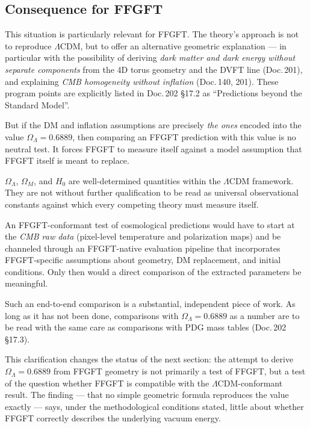 \subsection{Consequence for FFGFT}

This situation is particularly relevant for FFGFT. The theory's approach is not to reproduce \(\Lambda\)CDM, but to offer an alternative geometric explanation --- in particular with the possibility of deriving \emph{dark matter and dark energy without separate components} from the 4D torus geometry and the DVFT line (Doc.\,201), and explaining \emph{CMB homogeneity without inflation} (Doc.\,140, 201). These program points are explicitly listed in Doc.\,202 \S17.2 as ``Predictions beyond the Standard Model''.

But if the DM and inflation assumptions are precisely \emph{the ones} encoded into the value \(\Omega_\Lambda = 0.6889\), then comparing an FFGFT prediction with this value is no neutral test. It forces FFGFT to measure itself against a model assumption that FFGFT itself is meant to replace.

\begin{conclusionBox}
\(\Omega_\Lambda\), \(\Omega_M\), and \(H_0\) are well-determined quantities within the \(\Lambda\)CDM framework. They are not without further qualification to be read as universal observational constants against which every competing theory must measure itself.

An FFGFT-conformant test of cosmological predictions would have to start at the \emph{CMB raw data} (pixel-level temperature and polarization maps) and be channeled through an FFGFT-native evaluation pipeline that incorporates FFGFT-specific assumptions about geometry, DM replacement, and initial conditions. Only then would a direct comparison of the extracted parameters be meaningful.

Such an end-to-end comparison is a substantial, independent piece of work. As long as it has not been done, comparisons with \(\Omega_\Lambda = 0.6889\) as a number are to be read with the same care as comparisons with PDG mass tables (Doc.\,202 \S17.3).
\end{conclusionBox}

This clarification changes the status of the next section: the attempt to derive \(\Omega_\Lambda = 0.6889\) from FFGFT geometry is not primarily a test of FFGFT, but a test of the question whether FFGFT is compatible with the \(\Lambda\)CDM-conformant result. The finding --- that no simple geometric formula reproduces the value exactly --- says, under the methodological conditions stated, little about whether FFGFT correctly describes the underlying vacuum energy.

